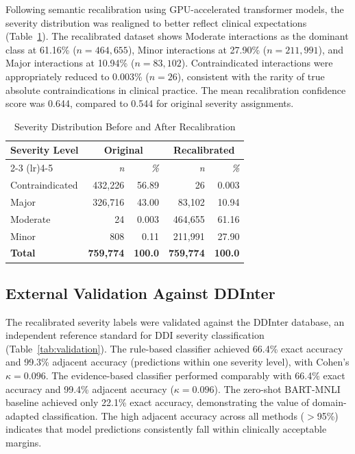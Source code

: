 \documentclass[11pt]{article}
\begin{document}
Following semantic recalibration using GPU-accelerated transformer models, the severity distribution was realigned to better reflect clinical expectations (Table~\ref{tab:severity}). The recalibrated dataset shows Moderate interactions as the dominant class at 61.16\% ($n = 464,655$), Minor interactions at 27.90\% ($n = 211,991$), and Major interactions at 10.94\% ($n = 83,102$). Contraindicated interactions were appropriately reduced to 0.003\% ($n = 26$), consistent with the rarity of true absolute contraindications in clinical practice. The mean recalibration confidence score was 0.644, compared to 0.544 for original severity assignments.

\begin{table}[H]
\centering
\caption{Severity Distribution Before and After Recalibration}
\label{tab:severity}
\begin{tabular}{lrrrr}
\toprule
\textbf{Severity Level} & \multicolumn{2}{c}{\textbf{Original}} & \multicolumn{2}{c}{\textbf{Recalibrated}} \\
\cmidrule(lr){2-3} \cmidrule(lr){4-5}
 & \textit{n} & \textit{\%} & \textit{n} & \textit{\%} \\
\midrule
Contraindicated & 432,226 & 56.89 & 26 & 0.003 \\
Major & 326,716 & 43.00 & 83,102 & 10.94 \\
Moderate & 24 & 0.003 & 464,655 & 61.16 \\
Minor & 808 & 0.11 & 211,991 & 27.90 \\
\midrule
\textbf{Total} & \textbf{759,774} & \textbf{100.0} & \textbf{759,774} & \textbf{100.0} \\
\bottomrule
\end{tabular}
\end{table}

\subsection*{External Validation Against DDInter}

The recalibrated severity labels were validated against the DDInter database, an independent reference standard for DDI severity classification (Table~\ref{tab:validation}). The rule-based classifier achieved 66.4\% exact accuracy and 99.3\% adjacent accuracy (predictions within one severity level), with Cohen's $\kappa = 0.096$. The evidence-based classifier performed comparably with 66.4\% exact accuracy and 99.4\% adjacent accuracy ($\kappa = 0.096$). The zero-shot BART-MNLI baseline achieved only 22.1\% exact accuracy, demonstrating the value of domain-adapted classification. The high adjacent accuracy across all methods ($>$95\%) indicates that model predictions consistently fall within clinically acceptable margins.
\end{document}
